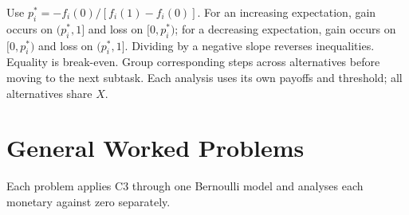 Use $p_i^*=-f_i(0)/[f_i(1)-f_i(0)]$. For an increasing expectation,
gain occurs on $(p_i^*,1]$ and loss on $[0,p_i^*)$; for a decreasing expectation,
gain occurs on $[0,p_i^*)$ and loss on $(p_i^*,1]$. Dividing by a negative slope reverses inequalities.
Equality is break-even. Group corresponding steps across alternatives before moving to the next subtask.
Each analysis uses its own payoffs and threshold; all alternatives share $X$.
\enlargethispage{\baselineskip}
\clearpage
\section{General Worked Problems}\label{sec:t2-c3-general}
Each problem applies C3 through one Bernoulli model and analyses each monetary  against zero separately.
